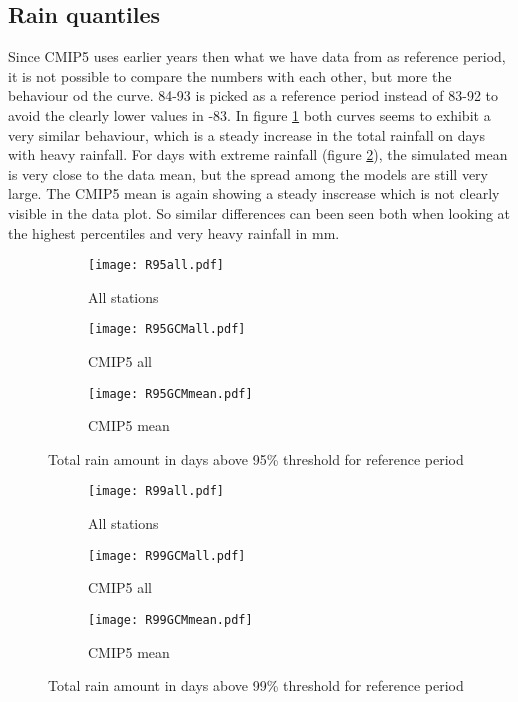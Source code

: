 \documentclass{article}
\begin{document}
	\subsection{Rain quantiles}
	Since CMIP5 uses earlier years then what we have data from as reference period, it is not possible to compare the numbers with each other, but more the behaviour od the curve. 84-93 is picked as a reference period instead of 83-92 to avoid the clearly lower values in -83. In figure \ref{R95} both curves seems to exhibit a very similar behaviour, which is a steady increase in the total rainfall on days with heavy rainfall. For days with extreme rainfall (figure \ref{R99}), the simulated mean is very close to the data mean, but the spread among the models are still very large. The CMIP5 mean is again showing a steady inscrease which is not clearly visible in the data plot. So similar differences can been seen both when looking at the highest percentiles and very heavy rainfall in mm. 
	\begin{figure}[H]
		\centering
		\begin{subfigure}{0.5\textwidth}
			\centering
			\texttt{[image: R95all.pdf]}
			\caption{All stations}
		\end{subfigure}%
		\begin{subfigure}{0.5\textwidth}
			\centering
			\texttt{[image: R95GCMall.pdf]}
			\caption{CMIP5 all}
		\end{subfigure}
		\begin{subfigure}{0.5\textwidth}
			\centering
			\texttt{[image: R95GCMmean.pdf]}
			\caption{CMIP5 mean}
		\end{subfigure}
		\caption{Total rain amount in days above 95\% threshold for reference period}
		\label{R95}
	\end{figure}

	\begin{figure}[H]
		\centering
		\begin{subfigure}{0.5\textwidth}
			\centering
			\texttt{[image: R99all.pdf]}
			\caption{All stations}
		\end{subfigure}%
		\begin{subfigure}{0.5\textwidth}
			\centering
			\texttt{[image: R99GCMall.pdf]}
			\caption{CMIP5 all}
		\end{subfigure}
		\begin{subfigure}{0.5\textwidth}
			\centering
			\texttt{[image: R99GCMmean.pdf]}
			\caption{CMIP5 mean}
		\end{subfigure}
		\caption{Total rain amount in days above 99\% threshold for reference period}
		\label{R99}
	\end{figure}
\end{document}
